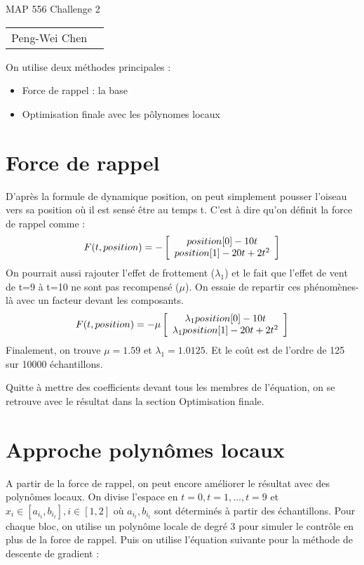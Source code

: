 \documentclass[12pt]{article}
\begin{document}
\begin{center}
    {\Large MAP 556 Challenge 2\\}
    \begin{tabular}{rl}
        Peng-Wei Chen\\
    \end{tabular}
\end{center}
On utilise deux méthodes principales :

\begin{itemize}
    \item{Force de rappel : la base}
    \item{Optimisation finale avec les pôlynomes locaux}
\end{itemize}

\section{Force de rappel}
D'après la formule de dynamique position, on peut simplement pousser l'oiseau vers sa position où il est sensé être au temps t. C'est à dire qu'on définit la force de rappel comme :
\[
    F(t, position) = -\left[
        \begin{array}[ht!]{c}
            position[0]-10t \\
            position[1]-20t+2t^2
        \end{array}
    \right]
\]
On pourrait aussi rajouter l'effet de frottement ($\lambda_1$) et le fait que l'effet de vent de t=9 à t=10 ne sont pas recompensé ($\mu$). On essaie de repartir ces phénomènes-là avec un facteur devant les composants.
\[
    F(t, position) = -\mu \left[
        \begin{array}[ht!]{c}
            \lambda_1 position[0]-10t \\
            \lambda_1 position[1]-20t+2t^2
        \end{array}
    \right]
\]
Finalement, on trouve $\mu = 1.59$ et $\lambda_1 = 1.0125$. Et le coût est de l'ordre de 125 sur 10000 échantillons.

Quitte à mettre des coefficients devant tous les membres de l'équation, on se retrouve avec le résultat dans la section Optimisation finale.

\section{Approche polynômes locaux}
A partir de la force de rappel, on peut encore améliorer le résultat avec des polynômes locaux. On divise l'espace en $t=0, t=1, \dots, t=9$ et $x_i \in[a_{i_t}, b_{i_t}], i\in[1, 2]$ où $a_{i_t}, b_{i_t}$ sont déterminés à partir des échantillons. 
Pour chaque bloc, on utilise un polynôme locale de degré 3 pour simuler le contrôle en plus de la force de rappel. Puis on utilise l'équation suivante pour la méthode de descente de gradient :
\end{document}
